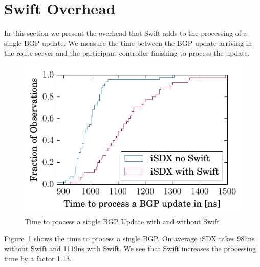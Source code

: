 \section{\label{chapter5:Swift overhead}Swift Overhead}

In this section we present the overhead that Swift adds to the processing of a single BGP update. We measure the time between the BGP update arriving in the route server and the participant controller finishing to process the update. 

\begin{figure}[h]
\center
\includegraphics[scale = 1]{Figures/results_overhead.pdf}
\caption{Time to process a single BGP Update with and without Swift}
\label{fig:swiftoverhead}
\end{figure}

Figure~\ref{fig:swiftoverhead} shows the time to process a single BGP. On average iSDX takes 987ns without Swift and 1119ns with Swift. We see that Swift increases the processing time by a factor 1.13.

\newpage